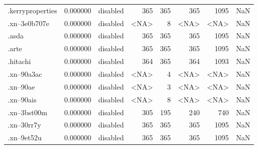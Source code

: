 \begin{tabular}{lrlrrrrl}
.kerryproperties          &          0.000000 &        disabled &                         365 &                         365 &                         365 &                1095 &                  NaN \\
.xn--3e0b707e             &          0.000000 &        disabled &                        <NA> &                           8 &                        <NA> &                <NA> &                  NaN \\
.asda                     &          0.000000 &        disabled &                         365 &                         365 &                         365 &                1095 &                  NaN \\
.arte                     &          0.000000 &        disabled &                         365 &                         365 &                         365 &                1095 &                  NaN \\
.hitachi                  &          0.000000 &        disabled &                         364 &                         365 &                         364 &                1093 &                  NaN \\
.xn--90a3ac               &          0.000000 &        disabled &                        <NA> &                           4 &                        <NA> &                <NA> &                  NaN \\
.xn--90ae                 &          0.000000 &        disabled &                        <NA> &                           3 &                        <NA> &                <NA> &                  NaN \\
.xn--90ais                &          0.000000 &        disabled &                        <NA> &                           8 &                        <NA> &                <NA> &                  NaN \\
.xn--3bst00m              &          0.000000 &        disabled &                         305 &                         195 &                         240 &                 740 &                  NaN \\
.xn--30rr7y               &          0.000000 &        disabled &                         365 &                         365 &                         365 &                1095 &                  NaN \\
.xn--9et52u               &          0.000000 &        disabled &                         365 &                         365 &                         365 &                1095 &                  NaN \\

\end{tabular}
